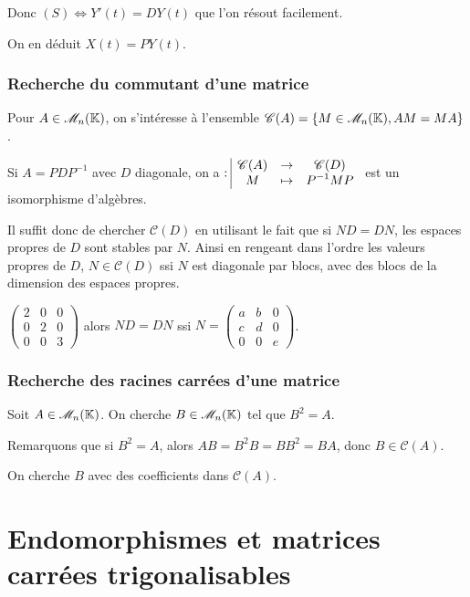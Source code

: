 Donc $(S) \iff Y'(t) = D Y(t)$ que l'on résout facilement. 

On en déduit $X(t) = P Y(t)$.

\subsubsection{Recherche du commutant d'une matrice }

Pour $A \in \mathscr M_n(\mathbb{K})$, on s'intéresse à l'ensemble $\mathscr C(A) = \{M \in \mathscr M_n(\mathbb{K}), AM = MA\}$.

Si $A = PDP^{-1}$ avec $D$ diagonale, on a 
$: \space \begin{array}{|ccc} \displaystyle \mathscr C (A) & \to & \displaystyle \mathscr C(D) \\ \displaystyle M & \mapsto & \displaystyle P^{-1} M P \end{array}$ est un isomorphisme d'algèbres.

Il suffit donc de chercher $\mathscr C(D)$ en utilisant le fait que si 
$ND = DN$, les espaces propres de $D$ sont stables par $N$. Ainsi en rengeant dans l'ordre les valeurs propres
de $D$, $N \in \mathscr C(D)$ ssi $N$ est diagonale par blocs, avec des blocs de la dimension des espaces propres. 

\begin{exemple}
    $\begin{pmatrix}
        2 & 0 & 0 \\
        0 & 2 & 0 \\
        0 & 0 & 3
    \end{pmatrix}$ alors $ND = DN$ ssi $N = \begin{pmatrix}
        a & b & 0 \\
        c & d & 0 \\
        0 & 0 & e
    \end{pmatrix}$.
\end{exemple}

\subsubsection{Recherche des racines carrées d'une matrice }

Soit $A \in \mathscr M_n(\mathbb{K})$. On cherche $B \in \mathscr M_n(\mathbb{K})$ tel que $B^2 = A$.

Remarquons que si $B^2 = A$, alors $AB = B^2B = BB^2 = BA$, donc $B \in \mathscr C(A)$.

On cherche $B$ avec des coefficients dans $\mathscr C(A)$.

\section{Endomorphismes et matrices carrées trigonalisables}

